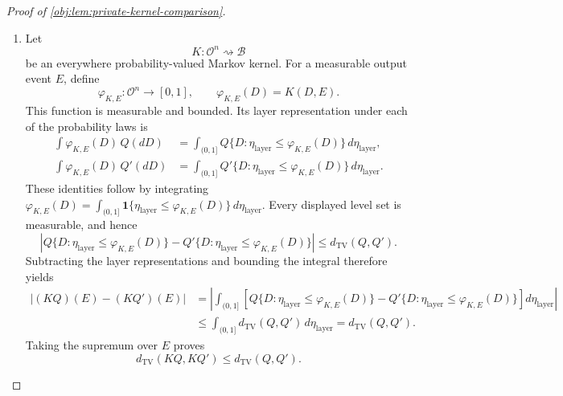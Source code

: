 \begin{proof}[Proof of \cref{obj:lem:private-kernel-comparison}]
\begin{enumerate}
\item Let
\[
K:\mathcal O^n\rightsquigarrow\mathcal B
\]
be an everywhere probability-valued Markov kernel. For a measurable output event \(E\), define
\[
\varphi_{K,E}:\mathcal O^n\longrightarrow[0,1],
\qquad
\varphi_{K,E}(D)=K(D,E).
\]
This function is measurable and bounded. Its layer representation under each of the probability laws is
\[
\begin{aligned}
\int\varphi_{K,E}(D)\,Q(dD)
&=\int_{(0,1]}Q\{D:\eta_{\mathrm{layer}}\le\varphi_{K,E}(D)\}\,d\eta_{\mathrm{layer}},\\
\int\varphi_{K,E}(D)\,Q'(dD)
&=\int_{(0,1]}Q'\{D:\eta_{\mathrm{layer}}\le\varphi_{K,E}(D)\}\,d\eta_{\mathrm{layer}}.
\end{aligned}
\]
These identities follow by integrating
\(\varphi_{K,E}(D)=\int_{(0,1]}\mathbf 1\{\eta_{\mathrm{layer}}\le\varphi_{K,E}(D)\}\,d\eta_{\mathrm{layer}}\).
Every displayed level set is measurable, and hence
\[
\left|
Q\{D:\eta_{\mathrm{layer}}\le\varphi_{K,E}(D)\}
-
Q'\{D:\eta_{\mathrm{layer}}\le\varphi_{K,E}(D)\}
\right|
\le d_{\mathrm{TV}}(Q,Q').
\]
Subtracting the layer representations and bounding the integral therefore yields
\[
\begin{aligned}
|(KQ)(E)-(KQ')(E)|
&=
\left|
\int_{(0,1]}
\left[
Q\{D:\eta_{\mathrm{layer}}\le\varphi_{K,E}(D)\}
-
Q'\{D:\eta_{\mathrm{layer}}\le\varphi_{K,E}(D)\}
\right]d\eta_{\mathrm{layer}}
\right|\\
&\le \int_{(0,1]}d_{\mathrm{TV}}(Q,Q')\,d\eta_{\mathrm{layer}}
=d_{\mathrm{TV}}(Q,Q').
\end{aligned}
\]
Taking the supremum over \(E\) proves
\[
d_{\mathrm{TV}}(KQ,KQ')\le d_{\mathrm{TV}}(Q,Q').
\]


\end{enumerate}
\end{proof}
